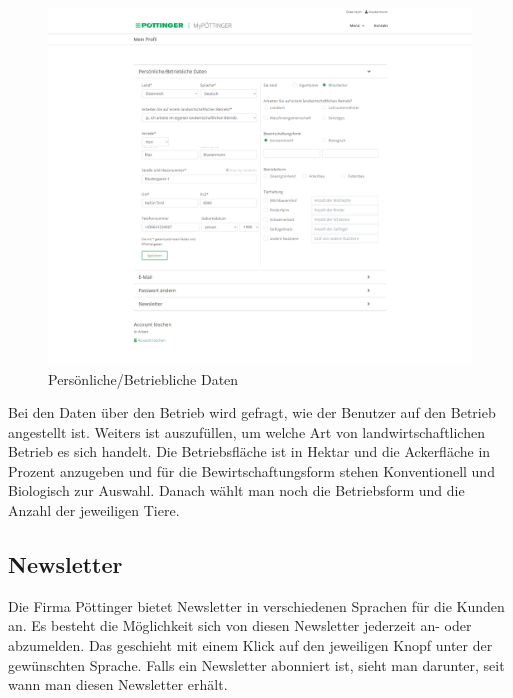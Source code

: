 \begin{figure}[H]
	\centerline{
		\includegraphics[width=1\textwidth, frame]{./grafiken/erm_profil_daten.png}
	}
	\vskip0pt
	\caption{Persönliche/Betriebliche Daten} \label{fig:profilData}
\end{figure}

Bei den Daten über den Betrieb wird gefragt, wie der Benutzer auf den Betrieb angestellt ist. Weiters ist auszufüllen, um welche Art von landwirtschaftlichen Betrieb es sich handelt. Die Betriebsfläche ist in Hektar und die Ackerfläche in Prozent anzugeben und für die Bewirtschaftungsform stehen Konventionell und Biologisch zur Auswahl. Danach wählt man noch die Betriebsform und die Anzahl der jeweiligen Tiere.

\subsection{Newsletter}

Die Firma Pöttinger bietet Newsletter in verschiedenen Sprachen für die Kunden an. Es besteht die Möglichkeit sich von diesen Newsletter jederzeit an- oder abzumelden. Das geschieht mit einem Klick auf den jeweiligen Knopf unter der gewünschten Sprache. Falls ein Newsletter abonniert ist, sieht man darunter, seit wann man diesen Newsletter erhält.

